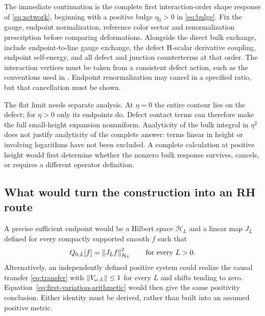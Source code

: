 The immediate continuation is the complete first interaction-order
shape response of \eqref{eq:network}, beginning with a positive bulge
$\eta_0>0$ in \eqref{eq:bulge}. Fix the gauge, endpoint normalization,
reference color sector and renormalization prescription before
comparing deformations. Alongside the direct bulk exchange, include
endpoint-to-line gauge exchange, the defect H-scalar derivative
coupling, endpoint self-energy, and all defect and junction
counterterms at that order. The interaction vertices must be taken
from a consistent defect action, such as the conventions used in
\cite{DFO,Baker}. Endpoint renormalization may cancel in a specified
ratio, but that cancellation must be shown.

The flat limit needs separate analysis. At $\eta=0$ the entire
contour lies on the defect; for $\eta>0$ only its endpoints do.
Defect contact terms can therefore make the full small-height
expansion nonuniform. Analyticity of the bulk integral in $\eta^2$
does not justify analyticity of the complete answer: terms linear
in height or involving logarithms have not been excluded. A complete
calculation at positive height would first determine whether the
nonzero bulk response survives, cancels, or requires a different
operator definition.

\subsection{What would turn the construction into an RH route}

A precise sufficient endpoint would be a Hilbert space $\mathcal H_L$
and a linear map $J_L$ defined for every compactly supported smooth
$f$ such that
\begin{equation}\label{eq:proof-target}
 Q_{0,L}[f]=\left\lVert J_Lf\right\rVert_{\mathcal H_L}^2
 \qquad\text{for every }L>0.
\end{equation}
Alternatively, an independently defined positive system could realize
the causal transfer \eqref{eq:transfer} with
$\left\lVert V_{\omega,L}\right\rVert\leq1$ for every $L$ and shifts tending to zero.
Equation~\eqref{eq:first-variation-arithmetic} would then give the
same positivity conclusion. Either identity must be derived, rather
than built into an assumed positive metric.


